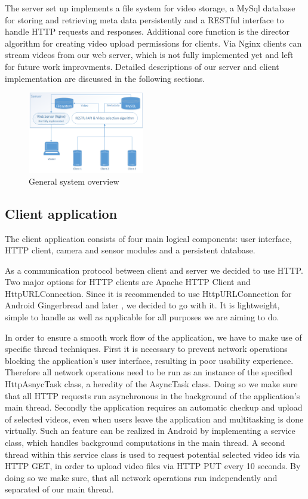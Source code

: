 \documentclass[conference]{IEEEtran}
\begin{document}
The server set up implements a file system for video storage, a MySql database for storing and retrieving meta data persistently and a RESTful interface to handle HTTP requests and responses.
Additional core function is the director algorithm for creating video upload permissions for clients. 
Via Nginx clients can stream videos from our web server, which is not fully implemented yet and left for future work improvments.
Detailed descriptions of our server and client implementation are discussed in the following sections.



\begin{figure}[!t]
	\centering
	\includegraphics[width=0.45\textwidth]{sys_arch.png}
	\caption{General system overview}
	\label{fig:gen_arch}
\end{figure}

\subsection{Client application}


The client application consists of four main logical components: 
user interface, HTTP client, camera and sensor modules and a persistent database.

As a communication protocol between client and server we decided to use HTTP.
Two major options for HTTP clients are Apache HTTP Client and HttpURLConnection.
Since it is recommended to use HttpURLConnection for Android Gingerbread and later \cite{jesse_wilson_androids},
we decided to go with it.
It is lightweight, simple to handle as well as applicable for all purposes we are aiming to do.

In order to ensure a smooth work flow of the application, we have to make use of specific thread techniques.
First it is necessary to prevent network operations blocking the application's user interface, resulting in poor usability experience.
Therefore all network operations need to be run as an instance 
of the specified HttpAsnycTask class, a heredity of the AsyncTask class. Doing so we make sure that all HTTP requests run asynchronous in 
the background of the application's main thread.
Secondly the application requires an automatic checkup and upload of selected videos, even when users leave the application and multitasking 
is done virtually. Such an feature can be realized in Android by implementing a service class, which handles background computations in the main 
thread. A second thread within this service class is used to request potential selected video ids via HTTP GET, in order to upload video files via HTTP PUT every 10 seconds.
By doing so we make sure, that all network operations run independently and separated of our main thread.
\end{document}
